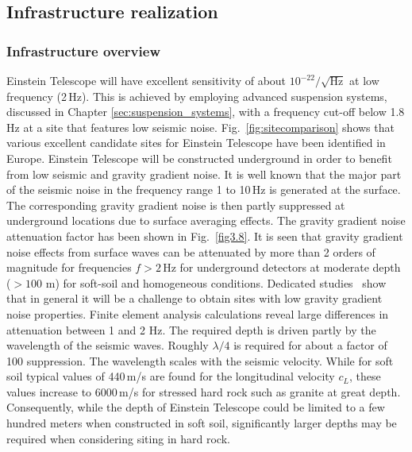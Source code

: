 \FloatBarrier
\subsection{Infrastructure realization}
\subsubsection{Infrastructure overview}
Einstein Telescope will have excellent sensitivity of about $10^{-22}/\sqrt{\mathrm{Hz}}$ at low frequency (2\,Hz). This is achieved by employing advanced suspension systems, discussed in Chapter \ref{sec:suspension_systems}, with a frequency cut-off below 1.8\,Hz at a site that features low seismic noise. Fig.~\ref{fig:sitecomparison} shows that various excellent candidate sites for Einstein Telescope have been identified in Europe. Einstein Telescope will be constructed underground in order to benefit from low seismic and gravity gradient noise. It is well known that the major part of the seismic noise in the frequency range 1 to 10\,Hz is generated at the surface. The corresponding gravity gradient noise is then partly suppressed at underground locations due to surface averaging effects. The gravity gradient noise attenuation factor has been shown in Fig.~\ref{fig3.8}. It is seen that gravity gradient noise effects from surface waves can be attenuated by more than 2 orders of magnitude for frequencies $f > 2$\,Hz for underground detectors at moderate depth ($>100$ m) for soft-soil and homogeneous conditions. Dedicated studies~\cite{GGCellaCuoco} show that in general it will be a challenge to obtain sites with low gravity gradient noise properties. Finite element analysis calculations reveal large differences in attenuation between 1 and 2 Hz. The required depth is driven partly by the wavelength of the seismic waves. Roughly $\lambda / 4$ is required for about a factor of 100 suppression. The wavelength scales with the seismic velocity. While for soft soil typical values of 440\,m/s are found for the longitudinal velocity $c_L$, these values increase to 6000\,m/s for stressed hard rock such as granite at great depth. Consequently, while the depth of Einstein Telescope could be limited to a few hundred meters when constructed in soft soil, significantly larger depths may be required when considering siting in hard rock. 
